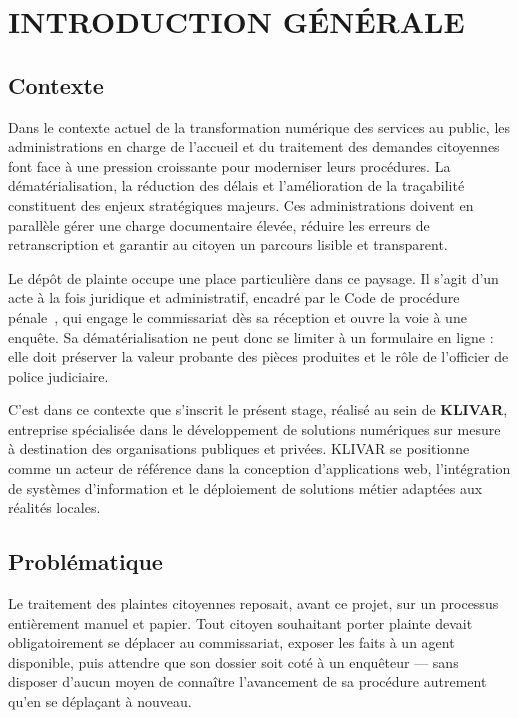 
\chapter*{INTRODUCTION GÉNÉRALE}
\label{ch:introduction}

\section*{Contexte}

Dans le contexte actuel de la transformation numérique des services au public, les administrations en charge de l'accueil et du traitement des demandes citoyennes font face à une pression croissante pour moderniser leurs procédures. La dématérialisation, la réduction des délais et l'amélioration de la traçabilité constituent des enjeux stratégiques majeurs. Ces administrations doivent en parallèle gérer une charge documentaire élevée, réduire les erreurs de retranscription et garantir au citoyen un parcours lisible et transparent.

Le dépôt de plainte occupe une place particulière dans ce paysage. Il s'agit d'un acte à la fois juridique et administratif, encadré par le Code de procédure pénale~\cite{cameroun:cpp}, qui engage le commissariat dès sa réception et ouvre la voie à une enquête. Sa dématérialisation ne peut donc se limiter à un formulaire en ligne : elle doit préserver la valeur probante des pièces produites et le rôle de l'officier de police judiciaire.

C'est dans ce contexte que s'inscrit le présent stage, réalisé au sein de \textbf{KLIVAR}, entreprise spécialisée dans le développement de solutions numériques sur mesure à destination des organisations publiques et privées. KLIVAR se positionne comme un acteur de référence dans la conception d'applications web, l'intégration de systèmes d'information et le déploiement de solutions métier adaptées aux réalités locales.

\section*{Problématique}

Le traitement des plaintes citoyennes reposait, avant ce projet, sur un processus entièrement manuel et papier. Tout citoyen souhaitant porter plainte devait obligatoirement se déplacer au commissariat, exposer les faits à un agent disponible, puis attendre que son dossier soit coté à un enquêteur — sans disposer d'aucun moyen de connaître l'avancement de sa procédure autrement qu'en se déplaçant à nouveau.

